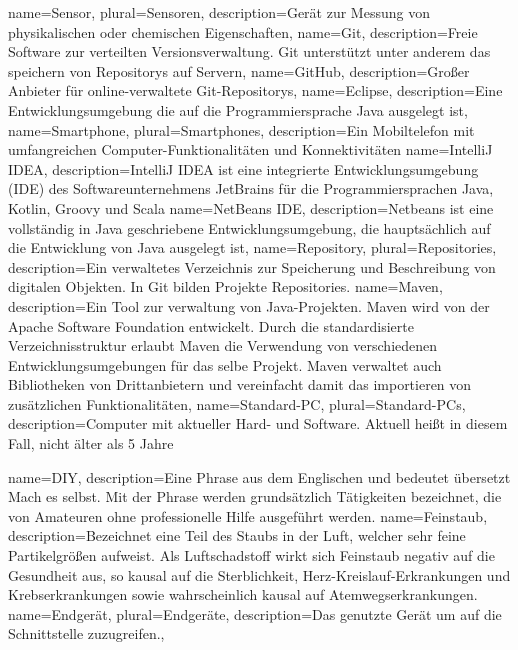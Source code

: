 \makenoidxglossaries
{}
{
	name=Sensor,
	plural=Sensoren,
	description={Gerät zur Messung von physikalischen oder chemischen Eigenschaften},
}
{
	name=Git,
	description={Freie Software zur verteilten Versionsverwaltung. Git unterstützt unter anderem das speichern von \glspl{Repository} auf Servern},
}
{
	name=GitHub,
	description={Großer Anbieter für online-verwaltete \gls{Git}-\glspl{Repository}},
}
{
	name=Eclipse,
	description={Eine Entwicklungsumgebung die auf die Programmiersprache Java ausgelegt ist},
}
{
	name=Smartphone,
	plural=Smartphones,
	description={Ein Mobiltelefon mit umfangreichen Computer-Funktionalitäten und Konnektivitäten}
}
{
	name=IntelliJ IDEA,
	description={IntelliJ IDEA ist eine integrierte Entwicklungsumgebung (IDE) des Softwareunternehmens JetBrains für die Programmiersprachen Java, Kotlin, Groovy und Scala}
}
{
	name=NetBeans IDE,
	description={Netbeans ist eine vollständig in Java geschriebene Entwicklungsumgebung, die hauptsächlich auf die Entwicklung von Java ausgelegt ist},
}
{
	name=Repository,
	plural=Repositories,
	description={Ein verwaltetes Verzeichnis zur Speicherung und Beschreibung von digitalen Objekten. In Git bilden Projekte Repositories.}
}
{
	name=Maven,
	description={Ein Tool zur verwaltung von Java-Projekten. Maven wird von der Apache Software Foundation entwickelt. Durch die standardisierte Verzeichnisstruktur erlaubt Maven die Verwendung von verschiedenen Entwicklungsumgebungen für das selbe Projekt. Maven verwaltet auch Bibliotheken von Drittanbietern und vereinfacht damit das importieren von zusätzlichen Funktionalitäten},
}
{
	name=Standard-PC,
	plural=Standard-PCs,
	description={Computer mit aktueller Hard- und Software. Aktuell heißt in diesem Fall, nicht älter als 5 Jahre}
}

{
	name=DIY,
	description={Eine Phrase aus dem Englischen und bedeutet übersetzt Mach es selbst. Mit der Phrase werden grundsätzlich Tätigkeiten bezeichnet, die von Amateuren ohne professionelle Hilfe ausgeführt werden.}
}
{
	name=Feinstaub,
	description={Bezeichnet eine Teil des Staubs in der Luft, welcher sehr feine Partikelgrößen aufweist. Als Luftschadstoff wirkt sich Feinstaub negativ auf die Gesundheit aus, so kausal auf die Sterblichkeit, Herz-Kreislauf-Erkrankungen und Krebserkrankungen sowie wahrscheinlich kausal auf Atemwegserkrankungen.}
}
 {
	name=Endgerät,
	plural=Endgeräte,
    description={Das genutzte Gerät um auf die Schnittstelle zuzugreifen.},
}

